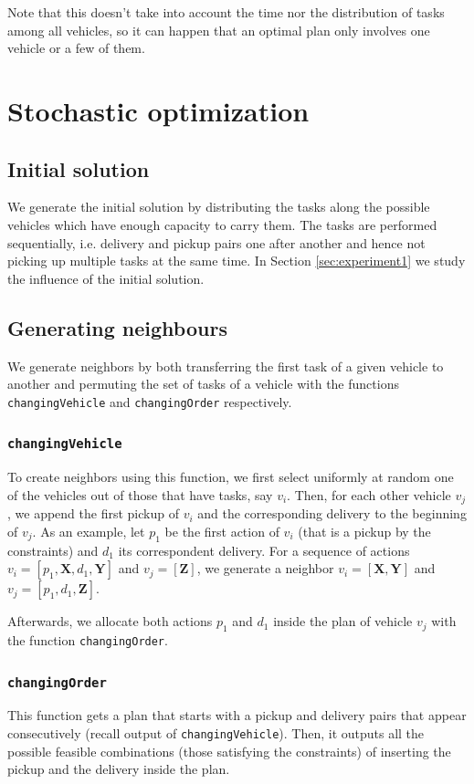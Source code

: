 \documentclass[11pt]{article}
\begin{document}
Note that this doesn't take into account the time nor the distribution of tasks among all vehicles, so it can happen that an optimal plan only involves one vehicle or a few of them.

\section{Stochastic optimization}

\subsection{Initial solution}
We generate the initial solution by distributing the tasks along the possible vehicles which have enough capacity to carry them. The tasks are performed sequentially, i.e. delivery and pickup pairs one after another and hence not picking up multiple tasks at the same time. In Section \ref{sec:experiment1} we study the influence of the initial solution. 

\subsection{Generating neighbours}
We generate neighbors by both transferring the first task of a given vehicle to another and permuting the set of tasks of a vehicle with the functions \texttt{changingVehicle} and \texttt{changingOrder} respectively.

\subsubsection{\texttt{changingVehicle}}
To create neighbors using this function, we first select uniformly at random one of the vehicles out of those that have tasks, say $v_i$. Then, for each other vehicle $v_j$, we append the first pickup of $v_i$ and the corresponding delivery to the beginning of $v_j$. As an example, let $p_1$ be the first action of $v_i$ (that is a pickup by the constraints) and $d_1$ its correspondent delivery. For a sequence of actions $v_i=[p_1, \mathbf{X},d_1,\mathbf{Y}]$ and $v_j=[\mathbf{Z}]$, we generate a neighbor $v_i=[\mathbf{X},\mathbf{Y}]$ and $v_j=[p_1, d_1, \mathbf{Z}]$.

Afterwards, we allocate both actions $p_1$ and $d_1$ inside the plan of vehicle $v_j$ with the function \texttt{changingOrder}.

\subsubsection{\texttt{changingOrder}}
This function gets a plan that starts with a pickup and delivery pairs that appear consecutively (recall output of \texttt{changingVehicle}). Then, it outputs all the possible feasible combinations (those satisfying the constraints) of inserting the pickup and the delivery inside the plan.
\end{document}
